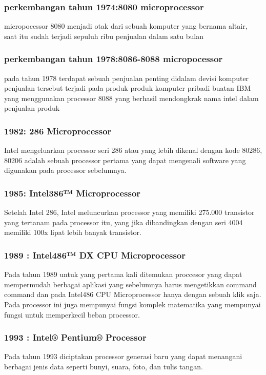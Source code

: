  	
 			\subsubsection{perkembangan tahun 1974:8080 microprocessor}
 	micropocessor 8080 menjadi otak dari sebuah komputer yang bernama altair, saat itu sudah terjadi sepuluh ribu penjualan dalam satu bulan
 			\subsubsection{perkembangan tahun 1978:8086-8088 micropocessor}
 	pada tahun 1978 terdapat sebuah penjualan penting didalam devisi komputer penjualan tersebut terjadi pada produk-produk komputer pribadi buatan IBM yang menggunakan processor 8088 yang berhasil mendongkrak nama intel dalam penjualan produk


 			\subsubsection{1982: 286 Microprocessor}
 	Intel mengeluarkan processor seri 286 atau yang lebih dikenal dengan kode 80286, 80206 adalah sebuah processor pertama yang dapat mengenali software yang digunakan pada processor sebelumnya.
 			\subsubsection{1985: Intel386™ Microprocessor}
 	Setelah Intel 286, Intel meluncurkan processor yang memiliki 275.000 transistor yang tertanam pada processor itu, yang jika dibandingkan dengan seri 4004 memiliki 100x lipat lebih banyak transistor.

 			\subsubsection{1989 : Intel486™ DX CPU Microprocessor}
 	Pada tahun 1989 untuk yang pertama kali  ditemukan proccesor yang dapat mempermudah berbagai aplikasi yang sebelumnya harus mengetikkan command command dan pada Intel486 CPU Microprocessor hanya dengan sebuah klik saja. Pada processor ini juga mempunyai fungsi komplek matematika yang mempunyai fungsi untuk memperkecil beban processor.
 			\subsubsection {1993 : Intel® Pentium® Processor}
 	Pada tahun 1993 diciptakan processor generasi baru yang dapat menangani berbagai jenis data seperti bunyi, suara, foto, dan tulis tangan.


